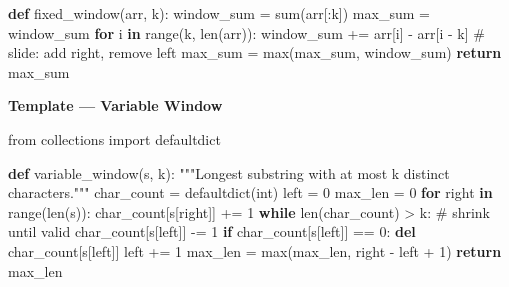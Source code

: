 \documentclass[11pt]{article}
\newenvironment{Shaded}{\begin{snugshade}}{\end{snugshade}}
\newcommand{\BuiltInTok}[1]{\textcolor[rgb]{0.50,0.55,0.55}{#1}}
\newcommand{\CommentTok}[1]{\textcolor[rgb]{0.48,0.49,0.49}{#1}}
\newcommand{\ControlFlowTok}[1]{\textcolor[rgb]{0.99,0.74,0.29}{\textbf{#1}}}
\newcommand{\DecValTok}[1]{\textcolor[rgb]{0.96,0.45,0.00}{#1}}
\newcommand{\ImportTok}[1]{\textcolor[rgb]{0.15,0.68,0.38}{#1}}
\newcommand{\KeywordTok}[1]{\textcolor[rgb]{0.81,0.81,0.76}{\textbf{#1}}}
\newcommand{\NormalTok}[1]{\textcolor[rgb]{0.81,0.81,0.76}{#1}}
\newcommand{\OperatorTok}[1]{\textcolor[rgb]{0.81,0.81,0.76}{#1}}
\begin{document}
\begin{Shaded}
\begin{Highlighting}[]
\KeywordTok{def}\NormalTok{ fixed\_window(arr, k):}
\NormalTok{    window\_sum }\OperatorTok{=} \BuiltInTok{sum}\NormalTok{(arr[:k])}
\NormalTok{    max\_sum }\OperatorTok{=}\NormalTok{ window\_sum}
    \ControlFlowTok{for}\NormalTok{ i }\KeywordTok{in} \BuiltInTok{range}\NormalTok{(k, }\BuiltInTok{len}\NormalTok{(arr)):}
\NormalTok{        window\_sum }\OperatorTok{+=}\NormalTok{ arr[i] }\OperatorTok{{-}}\NormalTok{ arr[i }\OperatorTok{{-}}\NormalTok{ k]   }\CommentTok{\# slide: add right, remove left}
\NormalTok{        max\_sum }\OperatorTok{=} \BuiltInTok{max}\NormalTok{(max\_sum, window\_sum)}
    \ControlFlowTok{return}\NormalTok{ max\_sum}
\end{Highlighting}
\end{Shaded}

\textbf{Template --- Variable Window}


\begin{Shaded}
\begin{Highlighting}[]
\ImportTok{from}\NormalTok{ collections }\ImportTok{import}\NormalTok{ defaultdict}

\KeywordTok{def}\NormalTok{ variable\_window(s, k):}
    \CommentTok{"""Longest substring with at most k distinct characters."""}
\NormalTok{    char\_count }\OperatorTok{=}\NormalTok{ defaultdict(}\BuiltInTok{int}\NormalTok{)}
\NormalTok{    left }\OperatorTok{=} \DecValTok{0}
\NormalTok{    max\_len }\OperatorTok{=} \DecValTok{0}
    \ControlFlowTok{for}\NormalTok{ right }\KeywordTok{in} \BuiltInTok{range}\NormalTok{(}\BuiltInTok{len}\NormalTok{(s)):}
\NormalTok{        char\_count[s[right]] }\OperatorTok{+=} \DecValTok{1}
        \ControlFlowTok{while} \BuiltInTok{len}\NormalTok{(char\_count) }\OperatorTok{\textgreater{}}\NormalTok{ k:          }\CommentTok{\# shrink until valid}
\NormalTok{            char\_count[s[left]] }\OperatorTok{{-}=} \DecValTok{1}
            \ControlFlowTok{if}\NormalTok{ char\_count[s[left]] }\OperatorTok{==} \DecValTok{0}\NormalTok{:}
                \KeywordTok{del}\NormalTok{ char\_count[s[left]]}
\NormalTok{            left }\OperatorTok{+=} \DecValTok{1}
\NormalTok{        max\_len }\OperatorTok{=} \BuiltInTok{max}\NormalTok{(max\_len, right }\OperatorTok{{-}}\NormalTok{ left }\OperatorTok{+} \DecValTok{1}\NormalTok{)}
    \ControlFlowTok{return}\NormalTok{ max\_len}
\end{Highlighting}
\end{Shaded}
\end{document}
